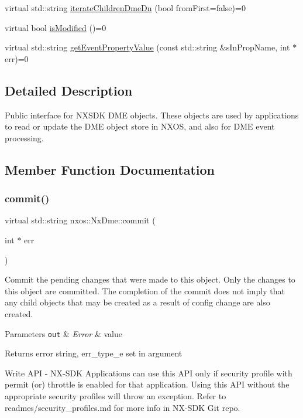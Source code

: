 \begin{DoxyCompactItemize}
\item 
virtual std\+::string \mbox{\hyperlink{classnxos_1_1_nx_dme_a61c6e95b39263694058082abeb377ac2}{iterate\+Children\+Dme\+Dn}} (bool from\+First=false)=0
\item 
virtual bool \mbox{\hyperlink{classnxos_1_1_nx_dme_af42da310beaee09535feda6dc618888b}{is\+Modified}} ()=0
\item 
virtual std\+::string \mbox{\hyperlink{classnxos_1_1_nx_dme_a883efffe8438738ac723e4a8e913e0ca}{get\+Event\+Property\+Value}} (const std\+::string \&s\+In\+Prop\+Name, int $\ast$err)=0
\end{DoxyCompactItemize}


\subsection{Detailed Description}
Public interface for N\+X\+S\+DK D\+ME objects. These objects are used by applications to read or update the D\+ME object store in N\+X\+OS, and also for D\+ME event processing. 

\subsection{Member Function Documentation}
\mbox{\label{classnxos_1_1_nx_dme_a61e01267ff642ace49a8fe75296a0cbd}} 
\subsubsection{\texorpdfstring{commit()}{commit()}}
{\footnotesize\ttfamily virtual std\+::string nxos\+::\+Nx\+Dme\+::commit (\begin{DoxyParamCaption}\item[{int $\ast$}]{err }\end{DoxyParamCaption})\hspace{0.3cm}{\ttfamily [pure virtual]}}

Commit the pending changes that were made to this object. Only the changes to this object are committed. The completion of the commit does not imply that any child objects that may be created as a result of config change are also created. 
\begin{DoxyParams}[1]{Parameters}
\mbox{\tt out}  & {\em Error} & value\\
\hline
\end{DoxyParams}
\begin{DoxyReturn}{Returns}
error string, err\+\_\+type\+\_\+e set in argument
\end{DoxyReturn}
\begin{DoxyVerb}Write API - NX-SDK Applications can use this API only if security profile with permit (or) throttle is 
            enabled for that application. Using this API without the appropriate security profiles will
            throw an exception. Refer to readmes/security_profiles.md for more info in NX-SDK Git repo.
\end{DoxyVerb}



